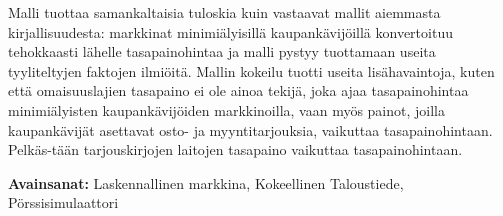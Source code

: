 Malli tuottaa samankaltaisia tuloskia kuin vastaavat mallit aiemmasta kirjallisuudesta: markkinat minimiälyisillä
kaupankävijöillä konvertoituu tehokkaasti lähelle tasapainohintaa ja malli pystyy tuottamaan useita tyyliteltyjen 
faktojen ilmiöitä. Mallin kokeilu tuotti useita lisähavaintoja, kuten että omaisuuslajien tasapaino ei ole ainoa tekijä,
joka ajaa tasapainohintaa minimiälyisten kaupankävijöiden markkinoilla, vaan myös painot, joilla kaupankävijät 
asettavat osto- ja myyntitarjouksia, vaikuttaa tasapainohintaan. 
Pelkäs-tään tarjouskirjojen laitojen tasapaino vaikuttaa 
tasapainohintaan.

\textbf{Avainsanat:} Laskennallinen markkina, Kokeellinen Taloustiede, Pörssisimulaattori